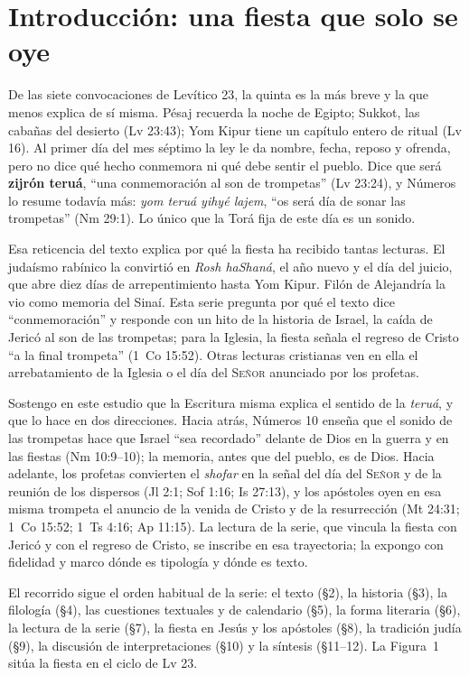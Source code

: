 \documentclass[11pt,letterpaper]{article}
\newcommand{\SENOR}{\textsc{Señor}}
\newcommand{\destacar}[1]{\textbf{\textcolor{tierraroja}{#1}}}
\begin{document}
\section{Introducción: una fiesta que solo se oye}

De las siete convocaciones de Levítico 23, la quinta es la más breve y la que menos explica de sí misma. Pésaj recuerda la noche de Egipto; Sukkot, las cabañas del desierto (Lv 23:43); Yom Kipur tiene un capítulo entero de ritual (Lv 16). Al primer día del mes séptimo la ley le da nombre, fecha, reposo y ofrenda, pero no dice qué hecho conmemora ni qué debe sentir el pueblo. Dice que será \destacar{zijrón teruá}, ``una conmemoración al son de trompetas'' (Lv 23:24), y Números lo resume todavía más: \emph{yom teruá yihyé lajem}, ``os será día de sonar las trompetas'' (Nm 29:1). Lo único que la Torá fija de este día es un sonido.

Esa reticencia del texto explica por qué la fiesta ha recibido tantas lecturas. El judaísmo rabínico la convirtió en \emph{Rosh haShaná}, el año nuevo y el día del juicio, que abre diez días de arrepentimiento hasta Yom Kipur. Filón de Alejandría la vio como memoria del Sinaí. Esta serie pregunta por qué el texto dice ``conmemoración'' y responde con un hito de la historia de Israel, la caída de Jericó al son de las trompetas; para la Iglesia, la fiesta señala el regreso de Cristo ``a la final trompeta'' (1~Co 15:52). Otras lecturas cristianas ven en ella el arrebatamiento de la Iglesia o el día del \SENOR{} anunciado por los profetas.

Sostengo en este estudio que la Escritura misma explica el sentido de la \emph{teruá}, y que lo hace en dos direcciones. Hacia atrás, Números 10 enseña que el sonido de las trompetas hace que Israel ``sea recordado'' delante de Dios en la guerra y en las fiestas (Nm 10:9--10); la memoria, antes que del pueblo, es de Dios. Hacia adelante, los profetas convierten el \emph{shofar} en la señal del día del \SENOR{} y de la reunión de los dispersos (Jl 2:1; Sof 1:16; Is 27:13), y los apóstoles oyen en esa misma trompeta el anuncio de la venida de Cristo y de la resurrección (Mt 24:31; 1~Co 15:52; 1~Ts 4:16; Ap 11:15). La lectura de la serie, que vincula la fiesta con Jericó y con el regreso de Cristo, se inscribe en esa trayectoria; la expongo con fidelidad y marco dónde es tipología y dónde es texto.

El recorrido sigue el orden habitual de la serie: el texto (§2), la historia (§3), la filología (§4), las cuestiones textuales y de calendario (§5), la forma literaria (§6), la lectura de la serie (§7), la fiesta en Jesús y los apóstoles (§8), la tradición judía (§9), la discusión de interpretaciones (§10) y la síntesis (§11--12). La Figura~1 sitúa la fiesta en el ciclo de Lv 23.
\end{document}
